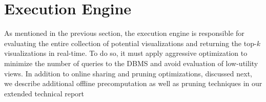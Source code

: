 
\section{{\large \SeeDB} Execution Engine}
\label{sec:optimizer}

As mentioned in the previous section, the \SeeDB execution engine is responsible for
evaluating the entire collection of potential visualizations and returning the top-$k$
visualizations in real-time.
To do so, it must apply aggressive optimization to minimize the number of queries to the
DBMS and avoid evaluation of low-utility views.
In addition to online sharing and pruning optimizations, discussed next, 
we describe additional offline precomputation as well as pruning techniques in our extended
technical report~\cite{seedb-tr}



